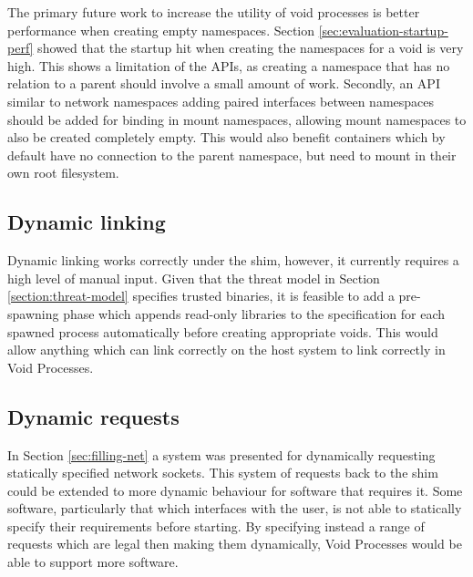 \documentclass[12pt,a4paper,twoside]{report}
\begin{document}
The primary future work to increase the utility of void processes is better performance when creating empty namespaces. Section \ref{sec:evaluation-startup-perf} showed that the startup hit when creating the namespaces for a void is very high. This shows a limitation of the APIs, as creating a namespace that has no relation to a parent should involve a small amount of work. Secondly, an API similar to network namespaces adding paired interfaces between namespaces should be added for binding in mount namespaces, allowing mount namespaces to also be created completely empty. This would also benefit containers which by default have no connection to the parent namespace, but need to mount in their own root filesystem.

\subsection{Dynamic linking}

Dynamic linking works correctly under the shim, however, it currently requires a high level of manual input. Given that the threat model in Section \ref{section:threat-model} specifies trusted binaries, it is feasible to add a pre-spawning phase which appends read-only libraries to the specification for each spawned process automatically before creating appropriate voids. This would allow anything which can link correctly on the host system to link correctly in Void Processes.

\subsection{Dynamic requests}

In Section \ref{sec:filling-net} a system was presented for dynamically requesting statically specified network sockets. This system of requests back to the shim could be extended to more dynamic behaviour for software that requires it. Some software, particularly that which interfaces with the user, is not able to statically specify their requirements before starting. By specifying instead a range of requests which are legal then making them dynamically, Void Processes would be able to support more software.

\label{lastcontentpage} %

 


\appendix


\label{lastpage}
\end{document}
